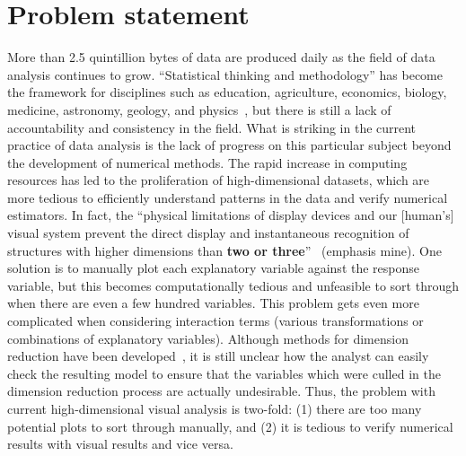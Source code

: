 \section{Problem statement}
\label{sec:intro:problem}

More than 2.5 quintillion bytes of data are produced daily as the field of data
analysis continues to grow. ``Statistical thinking and methodology'' has become
the framework for disciplines such as education, agriculture, economics,
biology, medicine, astronomy, geology, and physics~\cite{efron1986}, but there
is still a lack of accountability and consistency in the field. What is striking
in the current practice of data analysis is the lack of progress on this
particular subject beyond the development of numerical methods. The rapid
increase in computing resources has led to the proliferation of high-dimensional
datasets, which are more tedious to efficiently understand patterns in the data
and verify numerical estimators. In fact, the ``physical limitations of display
devices and our [human's] visual system prevent the direct display and
instantaneous recognition of structures with higher dimensions than \textbf{two
	or three}''~\cite{lius2016} (emphasis mine). One solution is to manually 
	plot
each explanatory variable against the response variable, but this becomes
computationally tedious and unfeasible to sort through when there are even a few
hundred variables. This problem gets even more complicated when considering
interaction terms (various transformations or combinations of explanatory
variables). Although methods for dimension reduction have been
developed~\cite{lius2016}, it is still unclear how the analyst can easily check
the resulting model to ensure that the variables which were culled in the
dimension reduction process are actually undesirable. Thus, the problem with
current high-dimensional visual analysis is two-fold: (1) there are too many
potential plots to sort through manually, and (2) it is tedious to verify
numerical results with visual results and vice versa. 

